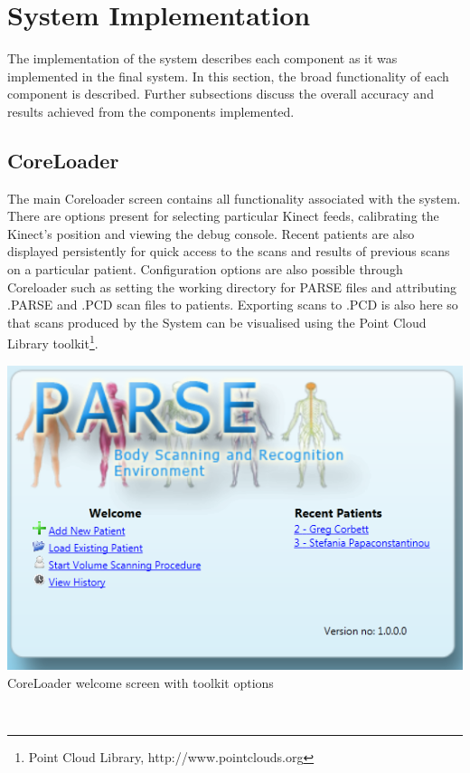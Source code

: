 \section{System Implementation}

The implementation of the system describes each component as it was implemented in the final system. In this section, the broad functionality of each component is described. Further subsections discuss the overall accuracy and results achieved from the components implemented. \\

\subsection{CoreLoader}

The main Coreloader screen contains all functionality associated with the system. There are options present for selecting particular Kinect feeds, calibrating the Kinect's position and viewing the debug console. Recent patients are also displayed persistently for quick access to the scans and results of previous scans on a particular patient. Configuration options are also possible through Coreloader such as setting the working directory for PARSE files and attributing .PARSE and .PCD scan files to patients. Exporting scans to .PCD is also here so that scans produced by the System can be visualised using the Point Cloud Library toolkit\footnote{Point Cloud Library, http://www.pointclouds.org}. \\

\begin{center}
    \includegraphics[scale=0.5]{zscreenshots/corewelcome.png}\\
    \caption{CoreLoader welcome screen with toolkit options}
\end{center} \\

